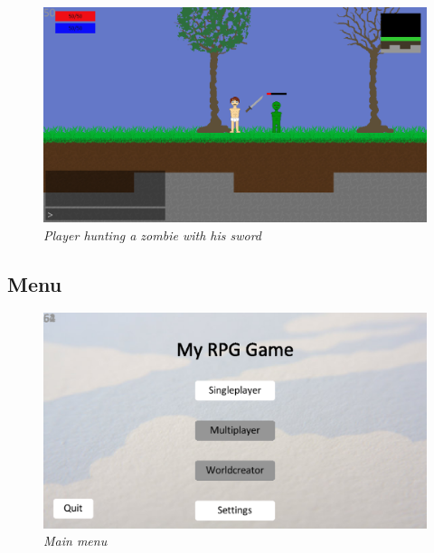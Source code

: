 \documentclass[a4paper,12pt]{article}
\begin{document}
\vspace{10pt}
\noindent
\begin{figure}[H]
\includegraphics[width=\textwidth]{img/screenshot3.eps}\\
\emph{%
    Player hunting a zombie with his sword
}
\end{figure}




\subsection{Menu}

\begin{figure}[H]
\includegraphics[width=\textwidth]{img/menushot1.eps}\\
\emph{%
    Main menu
}\\
\end{figure}
\end{document}
